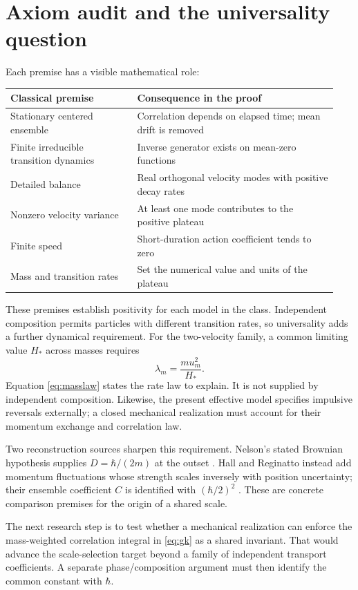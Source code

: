 \documentclass[11pt,a4paper]{article}
\begin{document}
\section{Axiom audit and the universality question}
Each premise has a visible mathematical role:
\begin{center}
\begin{tabular}{@{}p{0.36\linewidth}p{0.58\linewidth}@{}}
\toprule
Classical premise & Consequence in the proof\\
\midrule
Stationary centered ensemble & Correlation depends on elapsed time; mean drift is removed\\
Finite irreducible transition dynamics & Inverse generator exists on mean-zero functions\\
Detailed balance & Real orthogonal velocity modes with positive decay rates\\
Nonzero velocity variance & At least one mode contributes to the positive plateau\\
Finite speed & Short-duration action coefficient tends to zero\\
Mass and transition rates & Set the numerical value and units of the plateau\\
\bottomrule
\end{tabular}
\end{center}

These premises establish positivity for each model in the class. Independent
composition permits particles with different transition rates, so universality
adds a further dynamical requirement. For the two-velocity family, a common
limiting value $H_*$ across masses requires
\begin{equation}\label{eq:masslaw}
 \lambda_m=\frac{m u_m^2}{H_*}.
\end{equation}
Equation \eqref{eq:masslaw} states the rate law to explain. It is not supplied
by independent composition. Likewise, the present effective model specifies
impulsive reversals externally; a closed mechanical realization must account
for their momentum exchange and correlation law.

Two reconstruction sources sharpen this requirement. Nelson's stated
Brownian hypothesis supplies $D=\hbar/(2m)$ at the outset
\cite[abstract]{Nelson1966}. Hall and Reginatto instead add momentum
fluctuations whose strength scales inversely with position uncertainty;
their ensemble coefficient $C$ is identified with $(\hbar/2)^2$
\cite[pp.~5, 8]{HallReginatto2002}. These are concrete comparison premises
for the origin of a shared scale.

The next research step is to test whether a mechanical realization can enforce the
mass-weighted correlation integral in \eqref{eq:gk} as a shared invariant.
That would advance the scale-selection target beyond a family of independent
transport coefficients. A separate phase/composition argument must then
identify the common constant with $\hbar$.



\end{document}

